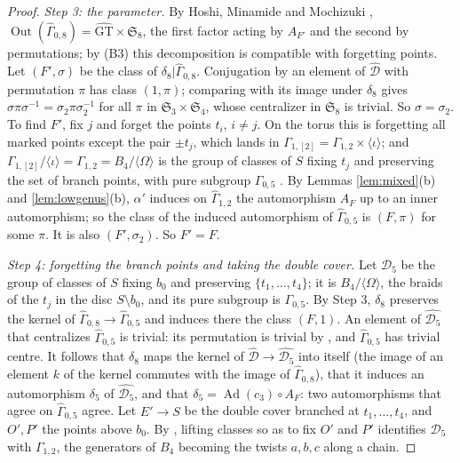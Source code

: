 \documentclass[11pt,a4paper]{article}
\theoremstyle{plain}
\theoremstyle{definition}
\theoremstyle{remark}
\newcommand{\GT}{\widehat{\mathrm{GT}}}
\newcommand{\Gh}{\widehat\Gamma}
\newcommand{\Ad}{\operatorname{Ad}}
\newcommand{\Out}{\operatorname{Out}}
\begin{document}
\begin{proof}
\emph{Step 3: the parameter.} By Hoshi, Minamide and Mochizuki \cite[Corollary C]{HMM},
$\Out(\Gh_{0,8})=\GT\times\mathfrak S_8$, the first factor acting by $A_{F'}$ and the second by permutations; by
(B3) this decomposition is compatible with forgetting points. Let $(F',\sigma)$ be the class of
$\delta_8|\Gh_{0,8}$. Conjugation by an element of $\widehat{\mathcal D}$ with permutation $\pi$ has class $(1,\pi)$;
comparing with its image under $\delta_8$ gives $\sigma\pi\sigma^{-1}=\sigma_2\pi\sigma_2^{-1}$ for all $\pi$ in
$\mathfrak S_3\times\mathfrak S_4$, whose centralizer in $\mathfrak S_8$ is trivial. So $\sigma=\sigma_2$. To find
$F'$, fix $j$ and forget the points $t_i$, $i\ne j$. On the torus this is forgetting all marked points except the
pair $\pm t_j$, which lands in $\Gamma_{1,[2]}=\Gamma_{1,2}\times\langle\iota\rangle$; and
$\Gamma_{1,[2]}/\langle\iota\rangle=\Gamma_{1,2}=B_4/\langle\Omega\rangle$ is the group of classes of $S$ fixing
$t_j$ and preserving the set of branch points, with pure subgroup $\Gamma_{0,5}$ \cite{BH}. By Lemmas
\ref{lem:mixed}(b) and \ref{lem:lowgenus}(b), $\alpha'$ induces on $\Gh_{1,2}$ the automorphism $A_F$ up to an
inner automorphism; so the class of the induced automorphism of $\Gh_{0,5}$ is $(F,\pi)$ for some $\pi$. It is also
$(F',\sigma_2)$. So $F'=F$.

\emph{Step 4: forgetting the branch points and taking the double cover.} Let $\mathcal D_5$ be the group of
classes of $S$ fixing $b_0$ and preserving $\{t_1,\dots,t_4\}$; it is $B_4/\langle\Omega\rangle$, the braids of
the $t_j$ in the disc $S\setminus b_0$, and its pure subgroup is $\Gamma_{0,5}$. By Step 3, $\delta_8$ preserves the
kernel of $\Gh_{0,8}\to\Gh_{0,5}$ and induces there the class $(F,1)$. An element of $\widehat{\mathcal D_5}$
that centralizes $\Gh_{0,5}$ is trivial: its permutation is trivial by \cite{HMM}, and $\Gh_{0,5}$ has trivial
centre. It follows that $\delta_8$ maps the kernel of $\widehat{\mathcal D}\to\widehat{\mathcal D_5}$ into itself
(the image of an element $k$ of the kernel commutes with the image of $\Gh_{0,8}$), that it induces an automorphism
$\delta_5$ of $\widehat{\mathcal D_5}$, and that $\delta_5=\Ad(c_3)\circ A_F$: two automorphisms that agree on
$\Gh_{0,5}$ agree. Let $E'\to S$ be the double cover branched at $t_1,\dots,t_4$, and $O',P'$ the points above
$b_0$. By \cite{BH}, lifting classes so as to fix $O'$ and $P'$ identifies $\mathcal D_5$ with
$\Gamma_{1,2}$, the generators of $B_4$ becoming the twists $a,b,c$ along a chain.


\end{proof}
\end{document}
